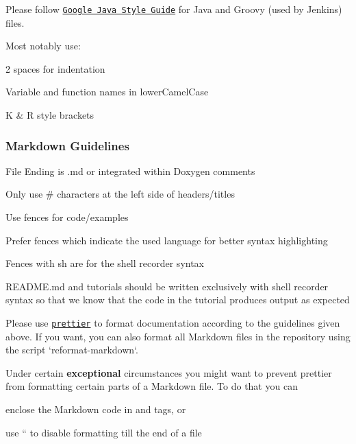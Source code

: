 Please follow \href{https://google.github.io/styleguide/javaguide.html}{\tt Google Java Style Guide} for Java and Groovy (used by Jenkins) files.

Most notably use\+:


\begin{DoxyItemize}
\item 2 spaces for indentation
\item Variable and function names in lower\+Camel\+Case
\item K \& R style brackets
\end{DoxyItemize}

\subsubsection*{Markdown Guidelines}


\begin{DoxyItemize}
\item File Ending is {\ttfamily .md} or integrated within Doxygen comments
\item Only use {\ttfamily \#} characters at the left side of headers/titles
\item Use fences for code/examples
\item Prefer fences which indicate the used language for better syntax highlighting
\item Fences with sh are for the shell recorder syntax
\item {\ttfamily R\+E\+A\+D\+M\+E.\+md} and tutorials should be written exclusively with shell recorder syntax so that we know that the code in the tutorial produces output as expected
\end{DoxyItemize}

Please use \href{https://prettier.io}{\tt {\ttfamily prettier}} to format documentation according to the guidelines given above. If you want, you can also format all Markdown files in the repository using the script `reformat-\/markdown`.

Under certain {\bfseries exceptional} circumstances you might want to prevent {\ttfamily prettier} from formatting certain parts of a Markdown file. To do that you can


\begin{DoxyItemize}
\item enclose the Markdown code in {\ttfamily and} tags, or
\item use `` to disable formatting till the end of a file
\end{DoxyItemize}


